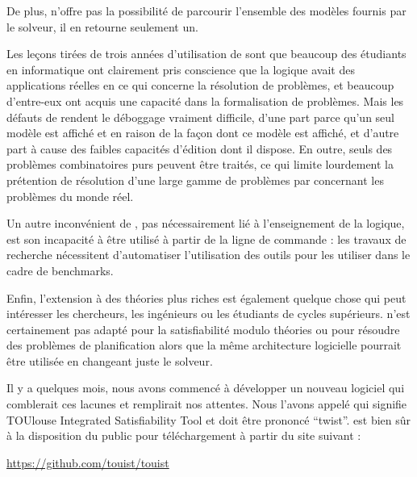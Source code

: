 De plus, \satoulouse n'offre pas la possibilité de parcourir l'ensemble des modèles fournis par le solveur, il en retourne seulement un.






\color{red}
Les leçons tirées de trois années d'utilisation de \satoulouse sont que beaucoup des étudiants en informatique ont clairement pris conscience que la logique avait des applications réelles en ce qui concerne la résolution de problèmes, et beaucoup d'entre-eux ont acquis une capacité dans la formalisation de problèmes. Mais les défauts de \satoulouse rendent le déboggage vraiment difficile, d'une part parce qu'un seul modèle est affiché et en raison de la façon dont ce modèle est affiché, et d'autre part à cause des faibles capacités d'édition dont il dispose. En outre, seuls des problèmes combinatoires purs peuvent être traités, ce qui limite lourdement la prétention de résolution d'une large gamme de problèmes par \satoulouse concernant les problèmes du monde réel.

Un autre inconvénient de \satoulouse, pas nécessairement lié à l'enseignement de la logique, est son incapacité à être utilisé à partir de la ligne de commande : les travaux de recherche nécessitent d'automatiser l'utilisation des outils pour les utiliser dans le cadre de benchmarks.

Enfin, l'extension à des théories plus riches est également quelque chose qui peut intéresser les chercheurs, les ingénieurs ou les étudiants de cycles supérieurs. \satoulouse n'est certainement pas adapté pour la satisfiabilité modulo théories ou pour résoudre des problèmes de planification alors que la même architecture logicielle pourrait être utilisée en changeant juste le solveur.


Il y a quelques mois, nous avons commencé à développer un nouveau logiciel qui comblerait ces lacunes et remplirait nos attentes. Nous l'avons appelé \touist qui signifie TOUlouse Integrated Satisfiability Tool et doit être prononcé \enquote{twist}.
 \touist est bien sûr à la disposition du public pour téléchargement à partir du site suivant :
\begin{center}\url{ https://github.com/touist/touist }\end{center}
\color{black}

